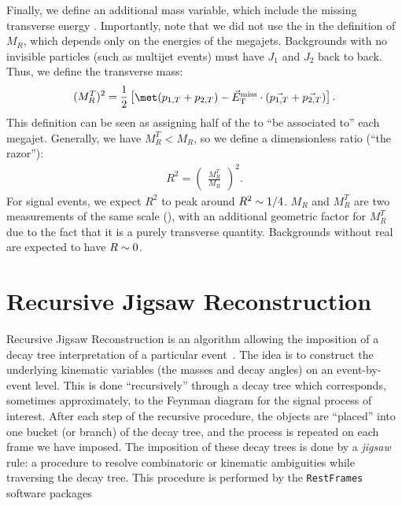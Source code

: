 Finally, we define an additional mass variable, which include the missing transverse energy \met.
Importantly, note that we did not use the \met in the definition of $M_R$, which depends only on the energies of the megajets.
Backgrounds with no invisible particles (such as multijet events) must have $J_1$ and $J_2$ back to back.
Thus, we define the transverse mass:
\begin{align}
(M_R^T)^2 = \frac{1}{2} \begin{bmatrix} \met(p_{1,T}  + p_{2,T}) - \metvec \cdot (\vec{p_{1,T}}  + \vec{p_{2,T} })  \end{bmatrix}.
\end{align}
This definition can be seen as assigning half of the \metvec to ``be associated to'' each megajet.
Generally, we have $M_R^T < M_R$, so we define a dimensionless ratio (``the razor''):
\begin{align}
R^2 = \begin{pmatrix} \frac{M_R^T}{M_R} \end{pmatrix}^2.
\end{align}
For signal events, we expect $R^2$ to peak around $R^2 \sim 1/4$.
$M_R$ and $M_R^T$ are two measurements of the same scale (\mheavy), with an additional geometric factor for $M_R^T$ due to the fact that it is a purely transverse quantity.
Backgrounds without real \met are expected to have $R \sim 0$.

\section{Recursive Jigsaw Reconstruction}

Recursive Jigsaw Reconstruction is an algorithm allowing the imposition of a decay tree interpretation of a particular event~\cite{Jackson:2016mfb,ATLAS-CONF-2016-078}.
The idea is to construct the underlying kinematic variables (the masses and decay angles) on an event-by-event level.
This is done ``recursively'' through a decay tree which corresponds, sometimes approximately, to the Feynman diagram for the signal process of interest.
After each step of the recursive procedure, the objects are ``placed'' into one bucket (or branch) of the decay tree, and the process is repeated on each frame we have imposed.
The imposition of these decay trees is done by a \textit{jigsaw} rule: a procedure to resolve combinatoric or kinematic ambiguities while traversing the decay tree.
This procedure is performed by the \texttt{RestFrames} software packages ~\cite{RestFrames}

